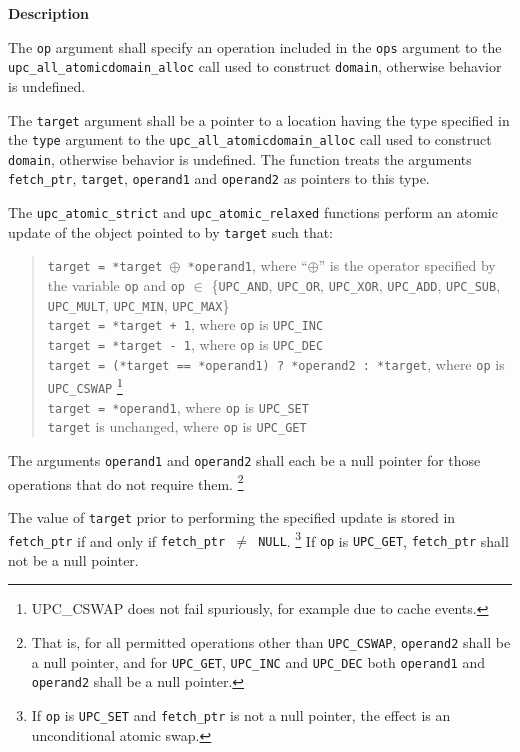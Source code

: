 {\bf Description}

\np The {\tt op} argument shall specify an operation included in the {\tt ops}
    argument to the {\tt upc\_all\_atomicdomain\_alloc} call used to construct
    {\tt domain}, otherwise behavior is undefined.

\np The {\tt target} argument shall be a pointer to a location having the type
    specified in the {\tt type} argument to the {\tt upc\_all\_atomicdomain\_alloc} 
    call used to construct {\tt domain}, otherwise behavior is undefined. 
    The function treats the arguments {\tt fetch\_ptr}, {\tt target}, 
    {\tt operand1} and {\tt operand2} as pointers to this type.

\np The {\tt upc\_atomic\_strict} and {\tt upc\_atomic\_relaxed} functions perform
    an atomic update of the object pointed to by {\tt target} such that:

    \begin{verse}
      {\tt *target = *target $\oplus$ *operand1},
        where ``$\oplus$'' is the operator specified by the variable {\tt op}
        and {\tt op} $\in$ \{{\tt UPC\_AND}, {\tt UPC\_OR}, {\tt UPC\_XOR},
        {\tt UPC\_ADD}, {\tt UPC\_SUB}, {\tt UPC\_MULT}, {\tt UPC\_MIN}, {\tt UPC\_MAX}\} \\
      {\tt *target = *target + 1}, 
        where {\tt op} is {\tt UPC\_INC} \\
      {\tt *target = *target - 1}, 
        where {\tt op} is {\tt UPC\_DEC} \\
      {\tt *target = (*target == *operand1) ? *operand2 : *target},
        where {\tt op} is {\tt UPC\_CSWAP}%
        \footnote{UPC\_CSWAP does not fail spuriously, for example due to cache events.} \\
      {\tt *target = *operand1},
        where {\tt op} is {\tt UPC\_SET} \\
      {\tt *target} is unchanged,
        where {\tt op} is {\tt UPC\_GET} \\
    \end{verse}

\np The arguments {\tt operand1} and {\tt operand2} shall each be a null
    pointer for those operations that do not require them.%
    \footnote{That is, for all permitted operations other than {\tt UPC\_CSWAP},
    {\tt operand2} shall be a null pointer, and for {\tt UPC\_GET}, {\tt UPC\_INC} and {\tt UPC\_DEC}
    both {\tt operand1} and {\tt operand2} shall be a null pointer.}

\np The value of {\tt *target} prior to performing
    the specified update is stored in {\tt *fetch\_ptr} if and only if
    {\tt fetch\_ptr $\neq$ NULL}.%
    \footnote{If {\tt op} is {\tt UPC\_SET} and {\tt fetch\_ptr} is
    not a null pointer, the effect is an unconditional atomic swap.}
    If {\tt op} is {\tt UPC\_GET}, {\tt fetch\_ptr} shall not be a null pointer.


